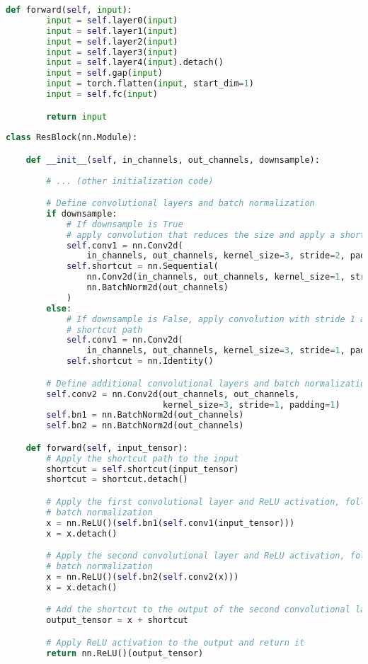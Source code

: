 \begin{lstlisting}[language=Python, caption={Residual Network (ResNet) architecture for audio processing with custom residual block implementation.}]
    def forward(self, input):
        input = self.layer0(input)
        input = self.layer1(input)
        input = self.layer2(input)
        input = self.layer3(input)
        input = self.layer4(input).detach()
        input = self.gap(input)
        input = torch.flatten(input, start_dim=1)
        input = self.fc(input)

        return input
  
class ResBlock(nn.Module):

    def __init__(self, in_channels, out_channels, downsample):
  
        # ... (other initialization code)

        # Define convolutional layers and batch normalization
        if downsample:
            # If downsample is True
            # apply convolution that reduces the size and apply a shortcut
            self.conv1 = nn.Conv2d(
                in_channels, out_channels, kernel_size=3, stride=2, padding=1)
            self.shortcut = nn.Sequential(
                nn.Conv2d(in_channels, out_channels, kernel_size=1, stride=2),
                nn.BatchNorm2d(out_channels)
            )
        else:
            # If downsample is False, apply convolution with stride 1 and no
            # shortcut path
            self.conv1 = nn.Conv2d(
                in_channels, out_channels, kernel_size=3, stride=1, padding=1)
            self.shortcut = nn.Identity()

        # Define additional convolutional layers and batch normalization
        self.conv2 = nn.Conv2d(out_channels, out_channels,
                               kernel_size=3, stride=1, padding=1)
        self.bn1 = nn.BatchNorm2d(out_channels)
        self.bn2 = nn.BatchNorm2d(out_channels)

    def forward(self, input_tensor):
        # Apply the shortcut path to the input
        shortcut = self.shortcut(input_tensor)
        shortcut = shortcut.detach()

        # Apply the first convolutional layer and ReLU activation, followed by
        # batch normalization
        x = nn.ReLU()(self.bn1(self.conv1(input_tensor)))
        x = x.detach()

        # Apply the second convolutional layer and ReLU activation, followed by
        # batch normalization
        x = nn.ReLU()(self.bn2(self.conv2(x)))
        x = x.detach()

        # Add the shortcut to the output of the second convolutional layer
        output_tensor = x + shortcut

        # Apply ReLU activation to the output and return it
        return nn.ReLU()(output_tensor)
\end{lstlisting}

